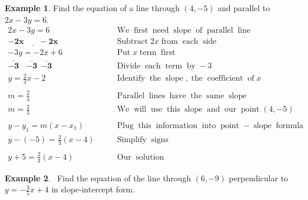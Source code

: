 \documentclass[12pt]{book}
\theoremstyle{definition}
\newtheorem{example}{Example}
\newcommand{\tmmathbf}[1]{\ensuremath{\boldsymbol{#1}}}
\newcommand{\tmop}[1]{\ensuremath{\operatorname{#1}}}
\begin{document}
\begin{example}\label{Lin71} Find the equation of a line through $(4, - 5)$ and parallel to $2 x - 3 y =6$.
  \begin{eqnarray*}
    2 x - 3 y = 6~~~~ &  & \tmop{We} \tmop{first} \tmop{need} \tmop{slope}
    \tmop{of} \tmop{parallel} \tmop{line}\\
    \tmmathbf{\underline{- 2 x ~~~~~~~~- 2 x}} &  & \tmop{Subtract} 2 x \tmop{from} \tmop{each}
    \tmop{side}\\
    - 3 y = - 2 x + 6~~~~ &  & \tmop{Put} x \tmop{term} \tmop{first}\\
    \tmmathbf{\overline{- 3} ~~~~ \overline{- 3} ~~ \overline{- 3}}~~~ &  & \tmop{Divide}
    \tmop{each} \tmop{term} \tmop{by} - 3\\
    y = \frac{2}{3} x - 2~~~~ &  & \tmop{Identify} \tmop{the} \tmop{slope},
    \tmop{the} \tmop{coefficient} \tmop{of} x\\
    &  & \\
    m = \frac{2}{3}~~~~ &  & \tmop{Parallel} \tmop{lines} \tmop{have} \tmop{the}
    \tmop{same} \tmop{slope}\\
    m = \frac{2}{3}~~~~ &  & \tmop{We} \tmop{will} \tmop{use} \tmop{this}
    \tmop{slope} \tmop{and} \tmop{our} \tmop{point} (4, - 5)\\
    &  & \\
    y - y_1 = m (x - x_1)~~~~ &  & \tmop{Plug} \tmop{this} \tmop{information}
    \tmop{into} \tmop{point}-\tmop{slope} \tmop{formula}\\
    y - (- 5) = \frac{2}{3} (x - 4)~~~~ &  & \tmop{Simplify} \tmop{signs}\\
    &  & \\
    y + 5 = \frac{2}{3} (x - 4)~~~~ &  & \tmop{Our} \tmop{solution}
  \end{eqnarray*}
\end{example}
\begin{example}\label{Lin72}\ Find the equation of the line through $(6, - 9)$ perpendicular to $y = -\displaystyle\frac{3}{5} x + 4$ in slope-intercept form.
\end{example}
\end{document}
